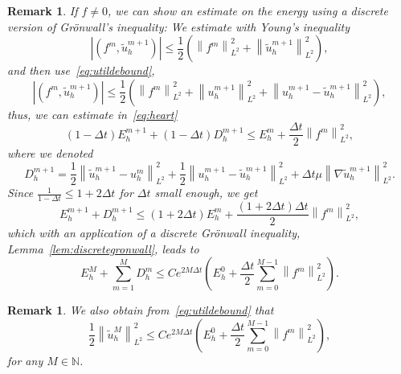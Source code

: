 \documentclass[10pt,letterpaper]{amsart}
\newcommand{\N}{\mathbb{N}}
\newcommand{\tu}{\widetilde{u}}
\newcommand\norm[1]{\left\lVert#1\right\rVert}
\newcommand{\Grad}{\nabla}
\newtheorem{remark}[lemma]{Remark}
\theoremstyle{definition}{\newtheorem{definition}[lemma]{Definition}}
\numberwithin{equation}{section}
\begin{document}
\begin{remark}\label{rem:fneq0}
	If $f\neq 0$, we can show an estimate on the energy using a discrete version of Gr\"onwall's inequality: 
	We estimate with Young's inequality
	\begin{equation*}
		\left|(f^m,\tu_h^{m+1})\right|\leq \frac{1}{2}\left(\norm{f^m}_{L^2}^2+\norm{\tu_h^{m+1}}_{L^2}^2\right),
	\end{equation*}
	and then use~\eqref{eq:utildebound},
		\begin{equation*}
		\left|(f^m,\tu_h^{m+1})\right|\leq \frac{1}{2}\left(\norm{f^m}_{L^2}^2+\norm{u_h^{m+1}}_{L^2}^2+ \norm{u^{m+1}_h-\tu^{m+1}_h}_{L^2}^2\right),
	\end{equation*}
	thus, we can estimate in~\eqref{eq:heart}  
	\begin{equation*}
		(1-\Delta t)E_h^{m+1} + (1-\Delta t)D_h^{m+1}\leq E_h^m + \frac{\Delta t}{2}\norm{f^m}_{L^2}^2,
	\end{equation*}
	where we denoted
	\begin{equation*}
		D_h^{m+1} = \frac12\norm{\tu_h^{m+1}-u^m_h}_{L^2}^2+\frac12\norm{u^{m+1}_h-\tu^{m+1}_h}^2_{L^2} + 
	\Delta t\mu\norm{\Grad \tu_h^{m+1}}_{L^2}^2.
	\end{equation*}
	Since $\frac{1}{1-\Delta t}\leq 1+2\Delta t$ for $\Delta t$ small enough, we get
	\begin{equation*}
		E_h^{m+1} + D_h^{m+1}\leq (1+2\Delta t)E_h^m + \frac{(1+2\Delta t)\Delta t}{2}\norm{f^m}_{L^2}^2,
	\end{equation*}
	which with an application of a discrete Gr\"onwall inequality, Lemma~\ref{lem:discretegronwall}, leads to
	\begin{equation*}
		E^M_h +\sum_{m=1}^{M}D_h^m\leq Ce^{2M\Delta t}\left(E_h^0+\frac{ \Delta t}{2}\sum_{m=0}^{M-1}\norm{f^m}_{L^2}^2\right).
	\end{equation*}
\end{remark}
\begin{remark}
	\label{rem:utildeL2bound}
	We also obtain from~\eqref{eq:utildebound}  that 
	\begin{equation}\label{eq:utildeL2bound}
		\frac{1}{2}\norm{\tu^M_h}_{L^2}^2\leq Ce^{2M\Delta t}\left(E_h^0+\frac{ \Delta t}{2}\sum_{m=0}^{M-1}\norm{f^m}_{L^2}^2\right),
	\end{equation}
	for any $M\in \N$.
\end{remark}
%
%
%
%
\end{document}
